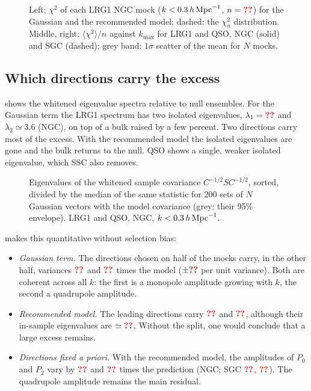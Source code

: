 \begin{figure}
  \centering{}
  \caption{Left: $\chi^2$ of each LRG1 NGC mock ($k<0.3\,h\,\mathrm{Mpc}^{-1}$, $n=\val{nbins}$) for the Gaussian and the recommended model; dashed: the $\chi^2_n$ distribution. Middle, right: $\langle\chi^2\rangle/n$ against $k_{\max}$ for LRG1 and QSO, NGC (solid) and SGC (dashed); grey band: $1\sigma$ scatter of the mean for $N$ mocks.}
  \label{fig:chi2}
\end{figure}

\subsection{Which directions carry the excess}
\label{sec:directions}

 shows the whitened eigenvalue spectra relative to null ensembles. For the Gaussian term the LRG1 spectrum has two isolated eigenvalues, $\lambda_1=\val{lam1/LRG1/NGC/G}$ and $\lambda_2\simeq3.6$ (NGC), on top of a bulk raised by a few percent. Two directions carry most of the excess. With the recommended model the isolated eigenvalues are gone and the bulk returns to the null. QSO shows a single, weaker isolated eigenvalue, which SSC also removes.

\begin{figure}
  \centering{}
  \caption{Eigenvalues of the whitened sample covariance $C^{-1/2}SC^{-1/2}$, sorted, divided by the median of the same statistic for 200 sets of $N$ Gaussian vectors with the model covariance (grey: their 95\% envelope). LRG1 and QSO, NGC, $k<0.3\,h\,\mathrm{Mpc}^{-1}$.}
  \label{fig:eigen}
\end{figure}

 makes this quantitative without selection bias:
\begin{itemize}
\item \emph{Gaussian term.} The directions chosen on half of the mocks carry, in the other half, variances $\val{cv/LRG1/NGC/G/1}$ and $\val{cv/LRG1/NGC/G/2}$ times the model ($\pm\val{cverr}$ per unit variance). Both are coherent across all $k$: the first is a monopole amplitude growing with $k$, the second a quadrupole amplitude.
\item \emph{Recommended model.} The leading directions carry $\val{cv/LRG1/NGC/rec/1}$ and $\val{cv/LRG1/NGC/rec/2}$, although their in-sample eigenvalues are $\simeq\val{insample/LRG1/NGC/rec/1}$. Without the split, one would conclude that a large excess remains.
\item \emph{Directions fixed a priori.} With the recommended model, the amplitudes of $P_0$ and $P_2$ vary by $\val{ampvar/LRG1/NGC/P0}$ and $\val{ampvar/LRG1/NGC/P2}$ times the prediction (NGC; SGC $\val{ampvar/LRG1/SGC/P0}$, $\val{ampvar/LRG1/SGC/P2}$). The quadrupole amplitude remains the main residual.
\end{itemize}

